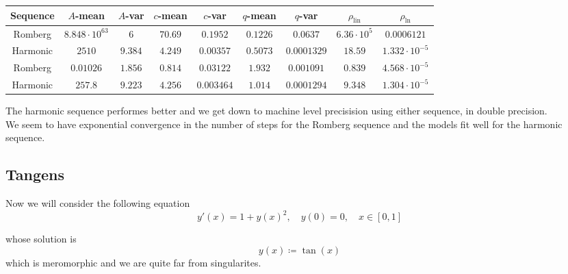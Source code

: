 \begin{table}[H]
    \centering
    \small
    \begin{tabular}{c||c|c|c|c|c|c|c|c}
Sequence & \(A\)-mean & \(A\)-var & \(c\)-mean & \(c\)-var & \(q\)-mean & \(q\)-var & \(\rho_{\operatorname{lin}}\) & \(\rho_{\ln}\)\\\hline
\rowcolor{red}
Romberg & \(8.848\cdot 10^{63}\) & \(6\) & \(70.69\) & \(0.1952\) & \(0.1226\) & \(0.0637\) & \(6.36\cdot 10^5\) & \(0.0006121\) \\
\rowcolor{green}
Harmonic & \(2510\) & \(9.384\) & \(4.249\) & \(0.00357\) & \(0.5073\) & \(0.0001329\) & \(18.59\) & \(1.332\cdot 10^{-5}\) \\
\rowcolor{green}
Romberg & \(0.01026\) & \(1.856\) & \(0.814\) & \(0.03122\) & \(1.932\) & \(0.001091\) & \(0.839\) & \(4.568\cdot 10^{-5}\) \\
\rowcolor{green}
Harmonic & \(257.8\) & \(9.223\) & \(4.256\) & \(0.003464\) & \(1.014\) & \(0.0001294\) & \(9.348\) & \(1.304\cdot 10^{-5}\) \\
    \end{tabular}
    \label{tab:my_label}
\end{table}

The harmonic sequence performes better and we get down to machine level precisision using either sequence, in double precision.\\

We seem to have exponential convergence in the number of steps for the Romberg sequence and the models fit well for the harmonic sequence.\\

\subsection{Tangens}

Now we will consider the following equation
\begin{equation}
y'(x) = 1 + y(x)^2, \quad y(0) = 0,\quad x\in [0,1]
\end{equation}

whose solution is 
\[
y(x) \coloneqq \tan(x)
\]
which is meromorphic and we are quite far from singularites.

